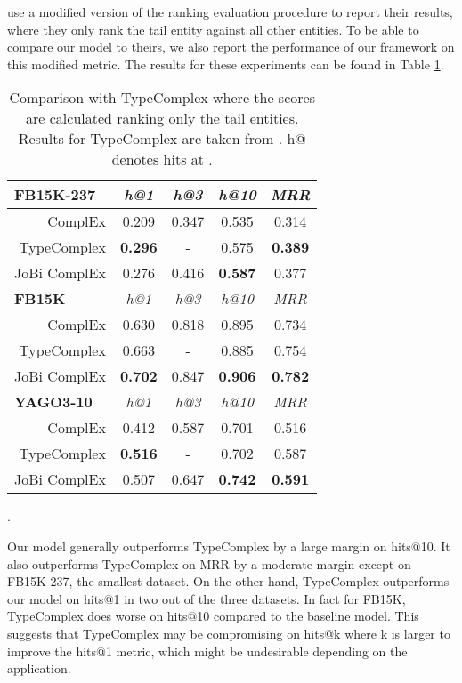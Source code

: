 \documentclass[11pt,a4paper, dvipsnames]{article}
\begin{document}
\citet{Jain2018Type-SensitiveSupervision} use a modified version of the ranking evaluation procedure to report their results, where they only rank the tail entity against all other entities. To be able to compare our model to theirs, we also report the performance of our framework on this modified metric. The results for these experiments can be found in Table \ref{tab:typecomplex}.


\begin{table}
    \centering
    \small
    \begin{tabular}{r | c c c c  }
      \multicolumn{1}{l|}{\textbf{FB15K-237}}  & \textit{h@1} & \textit{h@3} & \textit{h@10} & \textit{MRR} \\
         \hline 
         ComplEx & 0.209 & 0.347 & 0.535 & 0.314 \\
         TypeComplex & \textbf{0.296} & - & 0.575 & \textbf{0.389} \\ 
         JoBi ComplEx  & 0.276 & 0.416  & \textbf{0.587}  & 0.377 \\
         \hline \hline  
       \multicolumn{1}{l|}{\textbf{FB15K}}  & \textit{h@1} & \textit{h@3} & \textit{h@10} & \textit{MRR} \\
         \hline 
          ComplEx & 0.630 & 0.818 & 0.895 & 0.734 \\
         TypeComplex & 0.663 & - & 0.885 & 0.754 \\ 
         JoBi ComplEx  & \textbf{0.702} & 0.847 & \textbf{0.906} & \textbf{0.782} \\
         \hline\hline
       \multicolumn{1}{l|}{\textbf{YAGO3-10}}  & \textit{h@1} & \textit{h@3} & \textit{h@10} & \textit{MRR} \\
         \hline
        ComplEx & 0.412 & 0.587 & 0.701 & 0.516 \\
         TypeComplex & \textbf{0.516} & - & 0.702 & 0.587 \\ 
         JoBi ComplEx  & 0.507 & 0.647 & \textbf{0.742}  & \textbf{0.591}
    \end{tabular}
    \caption{Comparison with TypeComplex where the scores are calculated ranking only the tail entities. Results for TypeComplex are taken from \citet{Jain2018Type-SensitiveSupervision}. h@ denotes hits at .}
    \label{tab:typecomplex}. 
\end{table}

Our model generally outperforms TypeComplex by a large margin on hits@10. It also outperforms TypeComplex on MRR by a moderate margin except on FB15K-237, the smallest dataset. On the other hand, TypeComplex outperforms our model on hits@1 in two out of the three datasets. In fact for FB15K, TypeComplex does worse on hits@10 compared to the baseline model. This suggests that TypeComplex may be compromising on hits@k where k is larger to improve the hits@1 metric, which might be undesirable depending on the application. 
\end{document}
